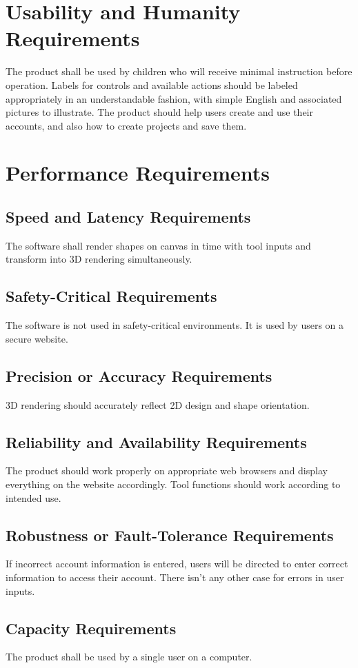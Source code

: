 \documentclass{report}
\begin{document}
\section{Usability and Humanity Requirements}
The product shall be used by children who will receive minimal instruction before operation.  Labels for controls and available actions should be labeled appropriately in an understandable fashion, with simple English and associated pictures to illustrate. The product should help users create and use their accounts, and also how to create projects and save them.  
\section{Performance Requirements}
\subsection{Speed and Latency Requirements}
The software shall render shapes on canvas in time with tool inputs and transform into 3D rendering simultaneously.
\subsection{Safety-Critical Requirements}
The software is not used in safety-critical environments.  It is used by users on a secure website.
\subsection{Precision or Accuracy Requirements}
3D rendering should accurately reflect 2D design and shape orientation.  
\subsection{Reliability and Availability Requirements}
The product should work properly on appropriate web browsers and display everything on the website accordingly.  Tool functions should work according to intended use.
\subsection{Robustness or Fault-Tolerance Requirements}
If incorrect account information is entered, users will be directed to enter correct information to access their account.  There isn't any other case for errors in user inputs.
\subsection{Capacity Requirements}
The product shall be used by a single user on a computer.
\end{document}

